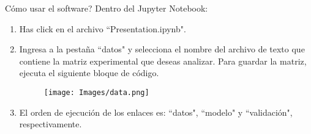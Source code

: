 \begin{frame}[t]{C\'omo usar el software?}\vspace{0pt}
Dentro del Jupyter Notebook:
\begin{enumerate}
	\item Has click en el archivo ``Presentation.ipynb".
	\item  Ingresa a la pesta\~na ``datos" y selecciona el nombre del archivo de texto que contiene la matriz experimental que deseas analizar. Para guardar la matriz, ejecuta el siguiente bloque de c\'odigo.
	\begin{figure}
		\texttt{[image: Images/data.png]}
	\end{figure}
	\item El orden de ejecuci\'on de los enlaces es: ``datos", ``modelo" y ``validaci\'on", respectivamente.
\end{enumerate}
\end{frame}